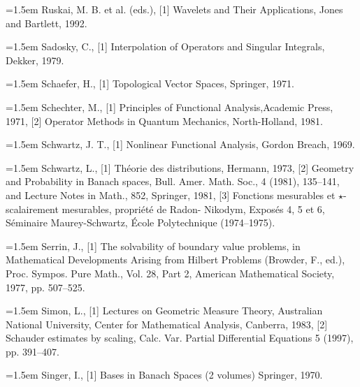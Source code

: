 \noindent\hangindent=1.5em Ruskai, M. B. et al. (eds.), \hypertarget{ref:RuskaiEtAl-1}{[1]} Wavelets and Their Applications, Jones and Bartlett, 1992.\par{}
\noindent\hangindent=1.5em Sadosky, C., \hypertarget{ref:Sadosky-1}{[1]} Interpolation of Operators and Singular Integrals, Dekker, 1979.\par{}
\noindent\hangindent=1.5em Schaefer, H., \hypertarget{ref:Schaefer-1}{[1]} Topological Vector Spaces, Springer, 1971.\par{}
\noindent\hangindent=1.5em Schechter, M., \hypertarget{ref:Schechter-1}{[1]} Principles of Functional Analysis,Academic Press, 1971, \hypertarget{ref:Schechter-2}{[2]} Operator Methods in Quantum Mechanics, North-Holland, 1981.\par{}
\noindent\hangindent=1.5em Schwartz, J. T., \hypertarget{ref:Schwartz-1}{[1]} Nonlinear Functional Analysis, Gordon Breach, 1969.\par{}
\noindent\hangindent=1.5em Schwartz, L., \hypertarget{ref:Schwartz-1}{[1]} Théorie des distributions, Hermann, 1973, \hypertarget{ref:Schwartz-2}{[2]} Geometry and Probability in Banach spaces, Bull. Amer. Math. Soc., 4 (1981), 135--141, and Lecture Notes in Math., 852, Springer, 1981, \hypertarget{ref:Schwartz-3}{[3]} Fonctions mesurables et $\star$-scalairement mesurables, propriété de Radon- Nikodym, Exposés 4, 5 et 6, Séminaire Maurey-Schwartz, École Polytechnique (1974--1975).\par{}
\noindent\hangindent=1.5em Serrin, J., \hypertarget{ref:Serrin-1}{[1]} The solvability of boundary value problems, in Mathematical Developments Arising from Hilbert Problems (Browder, F., ed.), Proc. Sympos. Pure Math., Vol. 28, Part 2, American Mathematical Society, 1977, pp. 507--525.\par{}
\noindent\hangindent=1.5em Simon, L., \hypertarget{ref:Simon-1}{[1]} Lectures on Geometric Measure Theory, Australian National University, Center for Mathematical Analysis, Canberra, 1983, \hypertarget{ref:Simon-2}{[2]} Schauder estimates by scaling, Calc. Var. Partial Differential Equations 5 (1997), pp. 391--407.\par{}
\noindent\hangindent=1.5em Singer, I., \hypertarget{ref:Singer-1}{[1]} Bases in Banach Spaces (2 volumes) Springer, 1970.\par{}
